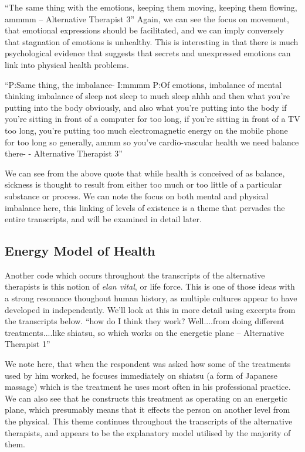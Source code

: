 ``The same thing with the emotions, keeping them moving, keeping them flowing, ammmm – Alternative Therapist 3''
Again, we can see the focus on movement, that emotional expressions should be facilitated, and we can imply conversely that stagnation of emotions is unhealthy. This is interesting in that there is much psychological evidence that suggests that secrets and unexpressed emotions can link into physical health problems. 

``P:Same thing, the imbalance-
I:mmmm
P:Of emotions, imbalance of mental thinking imbalance of sleep not sleep to much sleep ahhh and then what you're putting into the body obviously, and also what you're putting into the body if you're sitting in front of a computer for too long, if you're sitting in front of a TV too long, you're putting too much electromagnetic energy on the mobile phone for too long so generally, ammm so you've cardio-vascular health we need balance there- - Alternative Therapist 3''

We can see from the above quote that while health is conceived of as balance, sickness is thought to result from either too much or too little of a particular substance or process. We can note the focus on both mental and physical imbalance here, this linking of levels of existence is a theme that pervades the entire transcripts, and  will be examined in detail later. 

\subsection{Energy Model of Health}

Another code which occurs throughout the transcripts of the alternative therapists is this notion of \textit{elan vital}, or life force. This is one of those ideas with a strong resonance thoughout human history, as multiple cultures appear to have developed in independently. We'll look at this in more detail using excerpts from the transcripts below. 
``how do I think they work? Well....from doing different treatments....like shiatsu, so which works on the energetic plane – Alternative Therapist 1''

We note here, that when the respondent was asked how some of the treatments used by him worked, he focuses immediately on shiatsu (a form of Japanese massage) which is the treatment he uses most often in his professional practice. We can also see that he constructs this treatment as operating on an energetic plane, which presumably means that it effects the person on another level from the physical. This theme continues throughout the transcripts of the alternative therapists, and appears to be the explanatory model utilised by the majority of them. 

